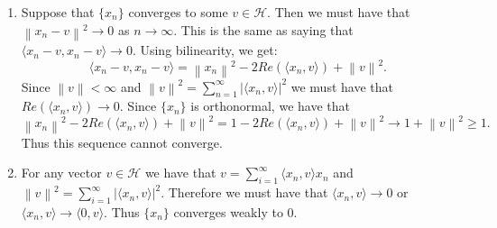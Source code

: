 \documentclass[12pt, a4paper]{article}
\theoremstyle{definition}
\newcommand{\penum}{ \begin{enumerate}[label=\bf(\alph*), leftmargin=0pt]}
\newcommand{\epenum}{ \end{enumerate} }
\newcommand{\lan}{\langle}
\newcommand{\ran}{\rangle}
\newcommand{\norm}[1]{\left\lVert#1\right\rVert}
\newcommand{\inn}[1]{\lan#1\ran}
\begin{document}
\penum
\item 
Suppose that $\{x_n\}$ converges to some $v \in \mathcal{H}$. Then we must have that $\norm{x_n - v}^2\to 0$ as $n \to \infty$. This is the same as saying that $\inn{x_n - v, x_n-v} \to 0$. Using bilinearity, we get:
$$\inn{x_n - v, x_n-v}  = \norm{x_n}^2 - 2 Re(\inn{x_n,v}) + \norm{v}^2. $$ Since $\norm{v} <\infty$ and $\norm{v}^2 = \sum_{n=1}^\infty |\inn{x_n,v}|^2$ we must have that $Re(\inn{x_n,v}) \to 0$. Since $\{x_n\}$ is orthonormal, we have that 
$$\norm{x_n}^2 - 2Re(\inn{x_n,v}) + \norm{v}^2 = 1 - 2 Re(\inn{x_n,v}) + \norm{v}^2 \to 1 + \norm{v}^2 \geq 1.$$
Thus this sequence cannot converge. 
\item For any vector $v\in \mathcal{H}$ we have that $v = \sum_{i=1}^\infty \inn{x_n,v}x_n$ and $\norm{v}^2 = \sum_{i=1}^\infty |\inn{x_n,v}|^2$. Therefore we must have that $\inn{x_n,v} \to 0$ or $\inn{x_n,v} \to \inn{0,v}$. Thus $\{x_n\}$ converges weakly to $0$. 

\epenum
\end{document}
